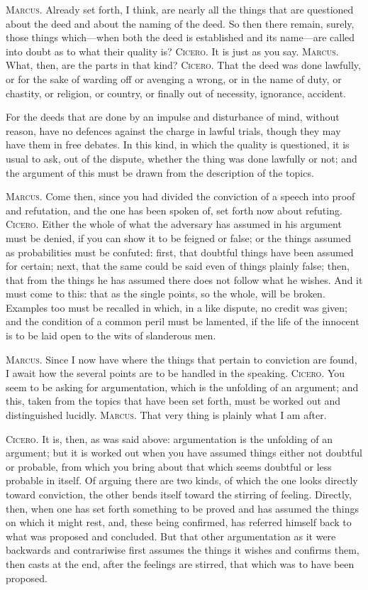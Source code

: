  \textsc{Marcus.} Already set forth, I think, are nearly all the things that are questioned about the deed and about the naming of the deed. So then there remain, surely, those things which—when both the deed is established and its name—are called into doubt as to what their quality is? \textsc{Cicero.} It is just as you say. \textsc{Marcus.} What, then, are the parts in that kind? \textsc{Cicero.} That the deed was done lawfully, or for the sake of warding off or avenging a wrong, or in the name of duty, or chastity, or religion, or country, or finally out of necessity, ignorance, accident.

 For the deeds that are done by an impulse and disturbance of mind, without reason, have no defences against the charge in lawful trials, though they may have them in free debates. In this kind, in which the quality is questioned, it is usual to ask, out of the dispute, whether the thing was done lawfully or not; and the argument of this must be drawn from the description of the topics.

 \textsc{Marcus.} Come then, since you had divided the conviction of a speech into proof and refutation, and the one has been spoken of, set forth now about refuting. \textsc{Cicero.} Either the whole of what the adversary has assumed in his argument must be denied, if you can show it to be feigned or false; or the things assumed as probabilities must be confuted: first, that doubtful things have been assumed for certain; next, that the same could be said even of things plainly false; then, that from the things he has assumed there does not follow what he wishes. And it must come to this: that as the single points, so the whole, will be broken. Examples too must be recalled in which, in a like dispute, no credit was given; and the condition of a common peril must be lamented, if the life of the innocent is to be laid open to the wits of slanderous men.

 \textsc{Marcus.} Since I now have where the things that pertain to conviction are found, I await how the several points are to be handled in the speaking. \textsc{Cicero.} You seem to be asking for argumentation, which is the unfolding of an argument; and this, taken from the topics that have been set forth, must be worked out and distinguished lucidly. \textsc{Marcus.} That very thing is plainly what I am after.

 \textsc{Cicero.} It is, then, as was said above: argumentation is the unfolding of an argument; but it is worked out when you have assumed things either not doubtful or probable, from which you bring about that which seems doubtful or less probable in itself. Of arguing there are two kinds, of which the one looks directly toward conviction, the other bends itself toward the stirring of feeling. Directly, then, when one has set forth something to be proved and has assumed the things on which it might rest, and, these being confirmed, has referred himself back to what was proposed and concluded. But that other argumentation as it were backwards and contrariwise first assumes the things it wishes and confirms them, then casts at the end, after the feelings are stirred, that which was to have been proposed.

